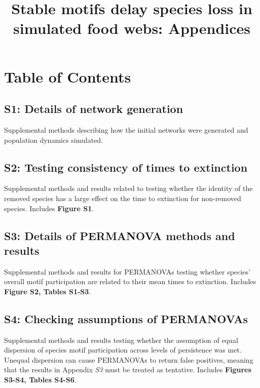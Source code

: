 \documentclass[12pt]{article}
\title{Stable motifs delay species loss in simulated food webs: Appendices}
\date{}
\author{}
\begin{document}
 
\maketitle 
\raggedright
\vspace{-1.25in}
\setlength{\parindent}{15pt} 

\section*{Table of Contents} 

    \subsection*{S1: Details of network generation}

        Supplemental methods describing how the initial networks were generated and population dynamics simulated.

    \subsection*{S2: Testing consistency of times to extinction}
    
        Supplemental methods and results related to testing whether the identity of the removed species has a large effect on the time to extinction for non-removed species. Includes \textbf{Figure S1}.
    
    \subsection*{S3: Details of PERMANOVA methods and results}
        
        Supplemental methods and results for PERMANOVAs testing whether species' overall motif participation are related to their mean times to extinction. Includes \textbf{Figure S2, Tables S1-S3}.

    \subsection*{S4: Checking assumptions of PERMANOVAs}


    	Supplemental methods and results testing whether the assumption of equal dispersion of species motif participation across levels of persistence was met. Unequal dispersion can cause PERMANOVAs to return false positives, meaning that the results in Appendix \emph{S3} must be treated as tentative. Includes \textbf{Figures S3-S4, Tables S4-S6}.
\end{document}
